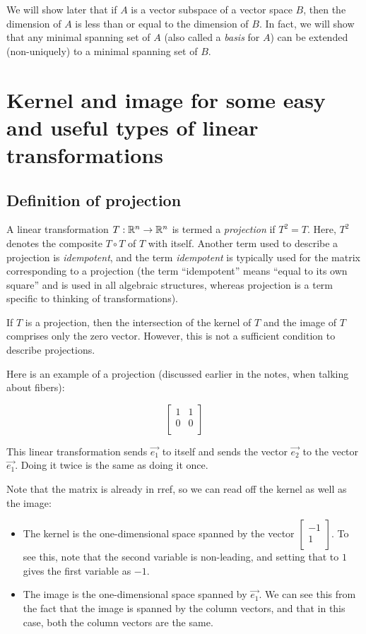\documentclass[10pt]{amsart}
\begin{document}
We will show later that if $A$ is a vector subspace of a vector space
$B$, then the dimension of $A$ is less than or equal to the dimension
of $B$. In fact, we will show that any minimal spanning set of $A$
(also called a {\em basis} for $A$) can be extended (non-uniquely) to
a minimal spanning set of $B$.


\section{Kernel and image for some easy and useful types of linear transformations}

\subsection{Definition of projection}

A linear transformation $T:\mathbb{R}^n \to \mathbb{R}^n$ is termed a {\em projection}
if $T^2 = T$. Here, $T^2$ denotes the composite $T \circ T$ of $T$
with itself. Another term used to describe a projection is {\em
  idempotent}, and the term {\em idempotent} is typically used for the
matrix corresponding to a projection (the term ``idempotent'' means
``equal to its own square'' and is used in all algebraic structures,
whereas projection is a term specific to thinking of transformations).

If $T$ is a projection, then the intersection of the kernel of $T$ and
the image of $T$ comprises only the zero vector. However, this is not
a sufficient condition to describe projections.

Here is an example of a projection (discussed earlier in the notes,
when talking about fibers):

$$\left[\begin{matrix} 1 & 1 \\ 0 & 0 \\\end{matrix}\right]$$

This linear transformation sends $\vec{e_1}$ to itself and sends the
vector $\vec{e_2}$ to the vector $\vec{e_1}$. Doing it twice is the
same as doing it once.

Note that the matrix is already in rref, so we can read off the kernel
as well as the image:

\begin{itemize}
\item The kernel is the one-dimensional space spanned by the vector
  $\left[\begin{matrix} -1 \\ 1 \\\end{matrix}\right]$. To see this,
  note that the second variable is non-leading, and setting that to
  $1$ gives the first variable as $-1$.
\item The image is the one-dimensional space spanned by
  $\vec{e_1}$. We can see this from the fact that the image is spanned
  by the column vectors, and that in this case, both the column
  vectors are the same.
\end{itemize}
\end{document}
